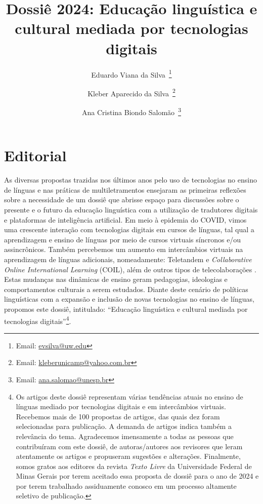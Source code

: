 \documentclass[portuguese]{textolivre}
\title{Dossiê 2024: Educação linguística e cultural mediada por tecnologias digitais}
\author[1]{Eduardo Viana da Silva~\orcid{0000-0002-3651-3524}\thanks{Email: \href{mailto:evsilva@uw.edu}{evsilva@uw.edu}}}
\author[2]{Kleber Aparecido da Silva~\orcid{0000-0002-7815-7767}\thanks{Email: \href{mailto:kleberunicamp@yahoo.com.br}{kleberunicamp@yahoo.com.br}}}
\author[3]{Ana Cristina Biondo Salomão~\orcid{0000-0002-1531-8551}\thanks{Email: \href{mailto:ana.salomao@unesp.br}{ana.salomao@unesp.br}}}
\affil[1]{University of Washington, Seattle, EUA.}
\affil[2]{Universidade de Brasília, Brasília, DF, Brasil.}
\affil[3]{Universidade Estadual Paulista ``Júlio de Mesquita Filho'', Araraquara, SP, Brasil.}
\begin{document}
\maketitle

\section{Editorial}
As diversas propostas trazidas nos últimos anos pelo uso de tecnologias no ensino de línguas e nas práticas de multiletramentos ensejaram as primeiras reflexões sobre a necessidade de um dossiê que abrisse espaço para discussões sobre o presente e o futuro da educação linguística com a utilização de tradutores digitais e plataformas de inteligência artificial. Em meio à epidemia do COVID, vimos uma crescente interação com tecnologias digitais em cursos de línguas, tal qual a aprendizagem e ensino de línguas por meio de cursos virtuais síncronos e/ou assincrônicos. Também percebemos um aumento em intercâmbios virtuais na aprendizagem de línguas adicionais, nomeadamente: Teletandem e \textit{Collaborative Online International Learning} (COIL), além de outros tipos de telecolaborações \cite{salomao2020,salomao2023}. Estas mudanças nas dinâmicas de ensino geram pedagogias, ideologias e comportamentos culturais a serem estudados. Diante deste cenário de políticas linguísticas com a expansão e inclusão de novas tecnologias no ensino de línguas, propomos este dossiê, intitulado: “Educação linguística e cultural mediada por tecnologias digitais”\footnote{Os artigos deste dossiê representam várias tendências atuais no ensino de línguas mediado por tecnologias digitais e em intercâmbios virtuais. Recebemos mais de 100 propostas de artigos, das quais dez foram selecionadas para publicação. A demanda de artigos indica também a relevância do tema. Agradecemos imensamente a todas as pessoas que contribuíram com este dossiê, de autoras/autores aos revisores que leram atentamente os artigos e propuseram sugestões e alterações. Finalmente, somos gratos aos editores da revista \textit{Texto Livre} da Universidade Federal de Minas Gerais por terem aceitado essa proposta de dossiê para o ano de 2024 e por terem trabalhado assiduamente conosco em um processo altamente seletivo de publicação.}.
\end{document}

